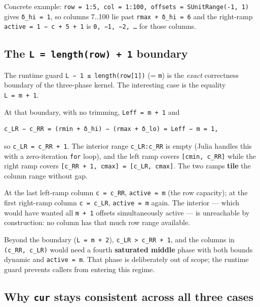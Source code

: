 \documentclass[
]{article}
\begin{document}
Concrete example:
\texttt{row\ =\ 1:5,\ col\ =\ 1:100,\ offsets\ =\ SUnitRange(-1,\ 1)}
gives \texttt{δ\_hi\ =\ 1}, so columns 7..100 lie past
\texttt{rmax\ +\ δ\_hi\ =\ 6} and the right-ramp
\texttt{active\ =\ 1\ −\ c\ +\ 5\ +\ 1} is \texttt{0,\ −1,\ −2,\ …} for
those columns.

\subsection{\texorpdfstring{The \texttt{L\ =\ length(row)\ +\ 1}
boundary}{The L = length(row) + 1 boundary}}\label{the-l-lengthrow-1-boundary}

The runtime guard \texttt{L\ −\ 1\ ≤\ length(row{[}1{]})} (= \texttt{m})
is the \emph{exact} correctness boundary of the three-phase kernel. The
interesting case is the equality \texttt{L\ =\ m\ +\ 1}.

At that boundary, with no trimming, \texttt{Leff\ =\ m\ +\ 1} and

\begin{verbatim}
c_LR − c_RR = (rmin + δ_hi) − (rmax + δ_lo) = Leff − m = 1,
\end{verbatim}

so \texttt{c\_LR\ =\ c\_RR\ +\ 1}. The interior range
\texttt{c\_LR:c\_RR} is empty (Julia handles this with a zero-iteration
\texttt{for} loop), and the left ramp covers \texttt{{[}cmin,\ c\_RR{]}}
while the right ramp covers
\texttt{{[}c\_RR\ +\ 1,\ cmax{]}\ =\ {[}c\_LR,\ cmax{]}}. The two ramps
\textbf{tile} the column range without gap.

At the last left-ramp column \texttt{c\ =\ c\_RR}, \texttt{active\ =\ m}
(the row capacity); at the first right-ramp column \texttt{c\ =\ c\_LR},
\texttt{active\ =\ m} again. The interior --- which would have wanted
all \texttt{m\ +\ 1} offsets simultaneously active --- is unreachable by
construction: no column has that much row range available.

Beyond the boundary (\texttt{L\ =\ m\ +\ 2}),
\texttt{c\_LR\ \textgreater{}\ c\_RR\ +\ 1}, and the columns in
\texttt{(c\_RR,\ c\_LR)} would need a fourth \textbf{saturated middle}
phase with both bounds dynamic and \texttt{active\ =\ m}. That phase is
deliberately out of scope; the runtime guard prevents callers from
entering this regime.

\subsection{\texorpdfstring{Why \texttt{cur} stays consistent across all
three
cases}{Why cur stays consistent across all three cases}}\label{why-cur-stays-consistent-across-all-three-cases}
\end{document}
